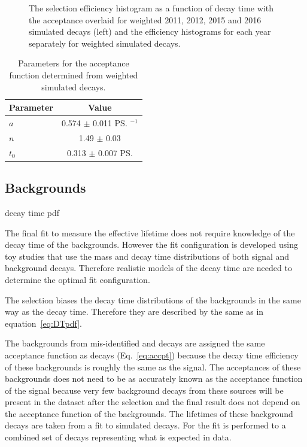 {\begin{figure}[htbp]
    \caption{The selection efficiency histogram as a function of decay time with the acceptance \pdf overlaid for weighted 2011, 2012, 2015 and 2016 simulated \bsmumu decays (left) and the efficiency histograms for each year separately for weighted simulated \bsmumu decays. }
    \label{fig:accptplot}
\end{figure}


\begin{table}[htbp]
\begin{center}
\begin{tabular}{lc}
\hline
Parameter & Value \\
\hline
$a$ & 0.574 $\pm$ 0.011 \ps$^{-1}$\\
$n$ & 1.49 $\pm$ 0.03 \\
$t_{0}$ &  0.313 $\pm$ 0.007 \ps \\

\hline
\end{tabular}
\vspace{0.7cm}             
\caption{Parameters for the \bsmumu acceptance function determined from weighted simulated \bsmumu decays.}
\label{tab:accptsig}
\end{center}
\vspace{-1.0cm}                                                                                                                                               
\end{table}

\subsection{Backgrounds} decay time pdf}
\label{sec:bkgDTpdf}

The final fit to measure the \bsmumu effective lifetime does not require knowledge of the decay time \pdfs of the backgrounds. However the fit configuration is developed using toy studies that use the mass and decay time distributions of both signal and background decays. Therefore realistic models of the decay time \pdfs are needed to determine the optimal fit configuration. 


The selection biases the decay time distributions of the backgrounds in the same way as the \bsmumu decay time. Therefore they are described by the same \pdfs as in equation~\ref{eq:DTpdf}. 

The backgrounds from mis-identified and \bdmumu decays are assigned the same acceptance function as \bsmumu decays (Eq.~\ref{eq:accpt}) because the decay time efficiency of these backgrounds is roughly the same as the signal. The acceptances of these backgrounds does not need to be as accurately known as the acceptance function of the signal because very few background decays from these sources will be present in the dataset after the selection and the final result does not depend on the acceptance function of the backgrounds. The lifetimes of these background decays are taken from a fit to simulated decays. For \bhh the fit is performed to a combined set of \bhh decays representing what is expected in data. %

